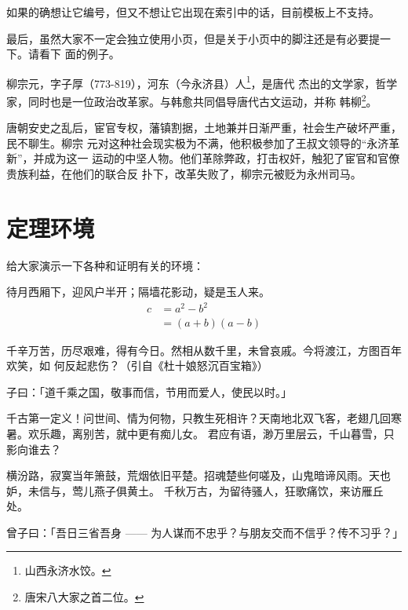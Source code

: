 如果的确想让它编号，但又不想让它出现在索引中的话，目前模板上不支持。

最后，虽然大家不一定会独立使用小页，但是关于小页中的脚注还是有必要提一下。请看下
面的例子。

\begin{minipage}[t]{\linewidth-2\parindent}
  柳宗元，字子厚（773-819），河东（今永济县）人\footnote{山西永济水饺。}，是唐代
  杰出的文学家，哲学家，同时也是一位政治改革家。与韩愈共同倡导唐代古文运动，并称
  韩柳\footnote{唐宋八大家之首二位。}。
\end{minipage}

唐朝安史之乱后，宦官专权，藩镇割据，土地兼并日渐严重，社会生产破坏严重，民不聊生。柳宗
元对这种社会现实极为不满，他积极参加了王叔文领导的“永济革新”，并成为这一
运动的中坚人物。他们革除弊政，打击权奸，触犯了宦官和官僚贵族利益，在他们的联合反
扑下，改革失败了，柳宗元被贬为永州司马。

\section{定理环境}
\label{sec:theorem}

给大家演示一下各种和证明有关的环境：

\begin{assumption}
待月西厢下，迎风户半开；隔墙花影动，疑是玉人来。
\begin{align}
  \label{eq:eqnxmp}
  c & = a^2 - b^2 \\
    & = (a+b)(a-b)
\end{align}
\end{assumption}

千辛万苦，历尽艰难，得有今日。然相从数千里，未曾哀戚。今将渡江，方图百年欢笑，如
何反起悲伤？（引自《杜十娘怒沉百宝箱》）

\begin{definition}
子曰：「道千乘之国，敬事而信，节用而爱人，使民以时。」
\end{definition}

千古第一定义！问世间、情为何物，只教生死相许？天南地北双飞客，老翅几回寒暑。欢乐趣，离别苦，就中更有痴儿女。
君应有语，渺万里层云，千山暮雪，只影向谁去？

横汾路，寂寞当年箫鼓，荒烟依旧平楚。招魂楚些何嗟及，山鬼暗谛风雨。天也妒，未信与，莺儿燕子俱黄土。
千秋万古，为留待骚人，狂歌痛饮，来访雁丘处。

\begin{proposition}
 曾子曰：「吾日三省吾身 —— 为人谋而不忠乎？与朋友交而不信乎？传不习乎？」
\end{proposition}


